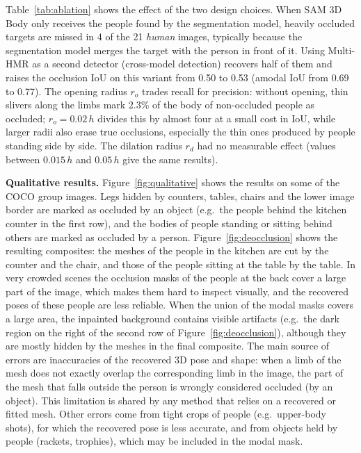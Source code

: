 \documentclass[11pt,a4paper]{article}
\begin{document}
Table~\ref{tab:ablation} shows the effect of the two design choices. When SAM 3D Body only receives the people found by the segmentation model, heavily occluded targets are missed in 4 of the 21 \emph{human} images, typically because the segmentation model merges the target with the person in front of it. Using Multi-HMR as a second detector (cross-model detection) recovers half of them and raises the occlusion IoU on this variant from 0.50 to 0.53 (amodal IoU from 0.69 to 0.77). The opening radius $r_o$ trades recall for precision: without opening, thin slivers along the limbs mark 2.3\% of the body of non-occluded people as occluded; $r_o = 0.02\,h$ divides this by almost four at a small cost in IoU, while larger radii also erase true occlusions, especially the thin ones produced by people standing side by side. The dilation radius $r_d$ had no measurable effect (values between $0.015\,h$ and $0.05\,h$ give the same results).

\textbf{Qualitative results.} Figure~\ref{fig:qualitative} shows the results on some of the COCO group images. Legs hidden by counters, tables, chairs and the lower image border are marked as occluded by an object (e.g.\ the people behind the kitchen counter in the first row), and the bodies of people standing or sitting behind others are marked as occluded by a person. Figure~\ref{fig:deocclusion} shows the resulting composites: the meshes of the people in the kitchen are cut by the counter and the chair, and those of the people sitting at the table by the table. In very crowded scenes the occlusion masks of the people at the back cover a large part of the image, which makes them hard to inspect visually, and the recovered poses of these people are less reliable. When the union of the modal masks covers a large area, the inpainted background contains visible artifacts (e.g.\ the dark region on the right of the second row of Figure~\ref{fig:deocclusion}), although they are mostly hidden by the meshes in the final composite. The main source of errors are inaccuracies of the recovered 3D pose and shape: when a limb of the mesh does not exactly overlap the corresponding limb in the image, the part of the mesh that falls outside the person is wrongly considered occluded (by an object). This limitation is shared by any method that relies on a recovered or fitted mesh. Other errors come from tight crops of people (e.g.\ upper-body shots), for which the recovered pose is less accurate, and from objects held by people (rackets, trophies), which may be included in the modal mask.
\end{document}
